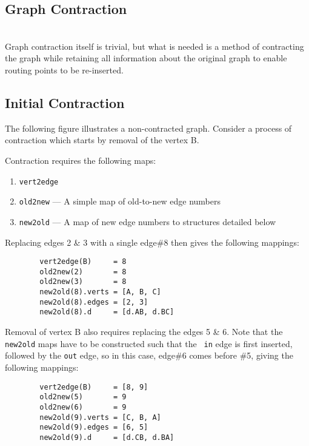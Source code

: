 \begin{spacing}{1.5}
    \section{Graph Contraction}\\

    \noindent Graph contraction itself is trivial, but what is needed is a method of contracting the graph while retaining all information about
    the original graph to enable routing points to be re-inserted.

    \vspace{12pt}\subsection{Initial Contraction}
    \noindent The following figure illustrates a non-contracted graph. Consider a process of contraction which starts by removal of the vertex B.

    

    Contraction requires the following maps:

    \begin{enumerate}
        \item{\tt vert2edge}
        \item{\tt old2new} --- A simple map of old-to-new edge numbers
        \item{\tt new2old} --- A map of new edge numbers to structures detailed below
    \end{enumerate}

    Replacing edges 2 \& 3 with a single edge\#8 then gives the following mappings:
    \begin{lstlisting}
        vert2edge(B)     = 8
        old2new(2)       = 8
        old2new(3)       = 8
        new2old(8).verts = [A, B, C]
        new2old(8).edges = [2, 3]
        new2old(8).d     = [d.AB, d.BC]
    \end{lstlisting}
    Removal of vertex B also requires replacing the edges 5 \& 6.  Note that the {\tt new2old} maps have to be constructed such that the {\tt
    in} edge is first inserted, followed by the {\tt out} edge, so in this case, edge\#6 comes before \#5, giving the following mappings:
    \begin{lstlisting}
        vert2edge(B)     = [8, 9]
        old2new(5)       = 9
        old2new(6)       = 9
        new2old(9).verts = [C, B, A]
        new2old(9).edges = [6, 5]
        new2old(9).d     = [d.CB, d.BA]
    \end{lstlisting}


\end{spacing}

